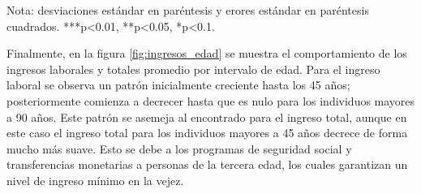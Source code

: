\documentclass[11pt,a4paper]{article}
\begin{document}
        \begin{table}[H]
          \centering
          \caption{Diferencia de medias variables independientes (B)} 
          \label{tab:dif_medias_b}
          \begin{tablenotes}
            \centering \footnotesize Nota: desviaciones estándar en paréntesis y erores estándar en paréntesis cuadrados.  ***p<0.01, **p<0.05, *p<0.1.            
        \end{tablenotes}
        \label{tbl:mediasIndB}
          \end{table}



          
          Finalmente, en la figura \ref{fig:ingresos_edad} se muestra el comportamiento de los ingresos laborales y totales promedio por intervalo de edad. Para el ingreso laboral se observa un patrón inicialmente creciente hasta los 45 años; posteriormente comienza a decrecer hasta que es nulo para los individuos mayores a 90 años. Este patrón se asemeja al encontrado para el ingreso total, aunque en este caso el ingreso total para los individuos mayores a 45 años decrece de forma mucho más suave. Esto se debe a los programas de seguridad social y transferencias monetarias a personas de la tercera edad, los cuales garantizan un nivel de ingreso mínimo en la vejez.
\end{document}
